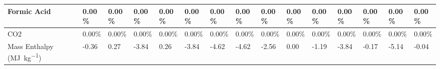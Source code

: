 \begin{landscape}
\begin{table}[H]
\begin{tabular}{|l|l|l|l|l|l|l|l|l|l|l|l|l|l|l|}
Formic Acid             & 0.00\%  & 0.00\%  & 0.00\%  & 0.00\%  & 0.00\%  & 0.00\%  & 0.00\%  & 0.00\%  & 0.00\%   & 0.00\%   & 0.00\%  & 0.00\%  & 0.00\%  & 0.00\%   \\ \hline
CO2                     & 0.00\%  & 0.00\%  & 0.00\%  & 0.00\%  & 0.00\%  & 0.00\%  & 0.00\%  & 0.00\%  & 0.00\%   & 0.00\%   & 0.00\%  & 0.00\%  & 0.00\%  & 0.00\%   \\ \hline
Mass Enthalpy (\si{\mega\J\per\kg})    & -0.36   & 0.27    & -3.84   & 0.26    & -3.84   & -4.62   & -4.62   & -2.56   & 0.00     & -1.19    & -3.84   & -0.17   & -5.14   & -0.04    \\ \hline
\end{tabular}
\end{table}







\end{landscape}
